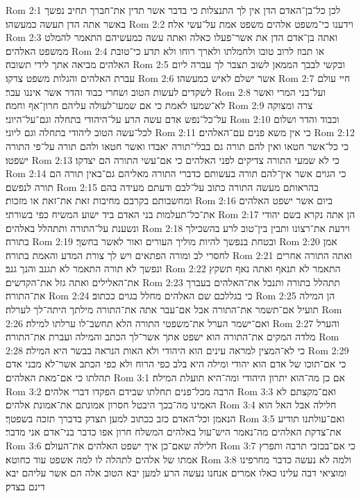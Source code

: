 Rom 2:1  לכן כל־בן־האדם הדן אין לך התנצלות כי בדבר אשר תדין את־חברך תחיב נפשך באשר אתה הדן תעשה כמעשהו׃
Rom 2:2  וידענו כי־משפט אלהים משפט אמת על־עשי אלה׃
Rom 2:3  ואתה בן־אדם הדן את אשר־פעלו כאלה ואתה עשה כמעשיהם התאמר להמלט ממשפט האלהים׃
Rom 2:4  או תבוז לרוב טובו ולחמלתו ולארך רוחו ולא תדע כי־טובת האלהים מביאה אתך לידי תשובה׃
Rom 2:5  ובקשי לבבך הממאן לשוב תצבר לך עברה ליום עברת האלהים והגלות משפט צדקו׃
Rom 2:6  אשר ישלם לאיש כמעשהו׃
Rom 2:7  חיי עולם לשקדים לעשות הטוב ושחרי כבוד והדר אשר איננו עבר׃
Rom 2:8  ועל־בני המרי ואשר לא־שמעו לאמת כי אם שמעו־לעולה עליהם חרון־אף וחמה׃
Rom 2:9  צרה ומצוקה על־כל־נפש אדם עשה הרע על־היהודי בתחלה וגם־על־היוני׃
Rom 2:10  וכבוד והדר ושלום לכל־עשה הטוב ליהודי בתחלה וגם ליוני׃
Rom 2:11  כי אין משא פנים עם־האלהים׃
Rom 2:12  כי כל־אשר חטאו ואין להם תורה גם בבלי־תורה יאבדו ואשר חטאו ולהם תורה על־פי התורה ישפטו׃
Rom 2:13  כי לא שמעי התורה צדיקים לפני האלהים כי אם־עשי התורה הם יצדקו׃
Rom 2:14  כי הגוים אשר אין־להם תורה בעשותם כדברי התורה מאליהם גם־באין תורה הם תורה לנפשם׃
Rom 2:15  בהראותם מעשה התורה כתוב על־לבם ודעתם מעידה בהם ומחשבותם בקרבם מחיבות זאת את־זאת או מזכות׃
Rom 2:16  ביום אשר ישפט האלהים את־כל־תעלמות בני האדם ביד ישוע המשיח כפי בשורתי׃
Rom 2:17  הן אתה נקרא בשם יהודי ונשענת על־התורה ותתהלל באלהים׃
Rom 2:18  וידעת את־רצונו ותבין בין־טוב לרע בהשכילך בתורה׃
Rom 2:19  ובטחת בנפשך להיות מוליך העורים ואור לאשר בחשך׃
Rom 2:20  אמן לחסרי לב ומורה הפתאים ויש לך צורת המדע והאמת בתורה׃
Rom 2:21  ואתה התורה אחרים ונפשך לא תורה התאמר לא תגנב והנך גנב׃
Rom 2:22  התאמר לא תנאף ואתה נאף תשקץ את־האלילים ואתה גזל את־הקדשים׃
Rom 2:23  תתהלל בתורה ותנבל את־האלהים בעברך את־התורה׃
Rom 2:24  כי בגללכם שם האלהים מחלל בגוים ככתוב׃
Rom 2:25  הן המילה תועיל אם־תשמר את־התורה אבל אם־עבר אתה את־התורה מילתך היתה־לך לערלה׃
Rom 2:26  ואם־ישמר הערל את־משפטי התורה הלא תחשב־לו ערלתו למילה׃
Rom 2:27  והערל מלדה המקים את־התורה הוא ישפט אתך אשר־לך הכתב והמילה ועברת את־התורה׃
Rom 2:28  כי לא־המצין למראה עינים הוא היהודי ולא האות הנראה בבשר היא המילה׃
Rom 2:29  כי אם־תוכו של אדם הוא יהודי ומילה היא בלב כפי הרוח ולא כפי הכתב אשר־לא מבני אדם תהלתו כי אם־מאת האלהים׃
Rom 3:1  אם כן מה־הוא יתרון היהודי ומה־היא תועלת המילה׃
Rom 3:2  הרבה מכל־פנים תחלתו שבידם הפקדו דברי אלהים׃
Rom 3:3  ואם־מקצתם לא האמינו מה־בכך היבטל חסרון אמונתם את־אמונת אלהים׃
Rom 3:4  חלילה אבל האל הוא הנאמן וכל־האדם כזב ככתוב למען תצדק בדברך תזכה בשפטך׃
Rom 3:5  ואם־עולתנו תודיע את־צדקת האלהים מה־נאמר היש־עול באלהים המשלח חרון אפו כדבר בני־אדם אני מדבר׃
Rom 3:6  חלילה שאם־כן איך ישפט האלהים את־העולם׃
Rom 3:7  כי אם־בכזבי תרבה ותפרץ אמתו של אלהים לתהלה לו למה אשפט עוד כחוטא׃
Rom 3:8  ולמה לא נעשה כדבר מחרפינו ומוציאי דבה עלינו כאלו אמרים אנחנו נעשה הרע למען יבא הטוב אלה הם אשר עליהם יבא דינם בצדק׃

